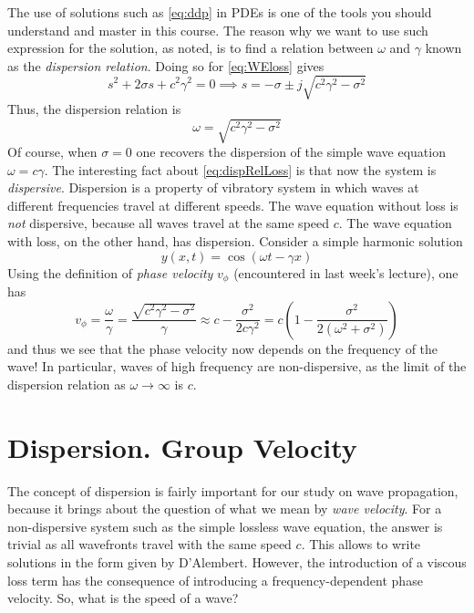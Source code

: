\documentclass[11pt,twoside,a4paper,english]{book}
\begin{document}
\medskip \medskip 
\noindent
The use of solutions such as \eqref{eq:ddp} in PDEs is one of the tools you should understand and master in this course. The reason why we want to use such expression for the solution, as noted, is to find a relation between $\omega$ and $\gamma$ known as the \emph{dispersion relation}. Doing so for \eqref{eq:WEloss} gives
\begin{equation}
s^2 + 2 \sigma s + c^2 \gamma^2 = 0 \implies s = - \sigma \pm j \sqrt{c^2\gamma^2 - \sigma^2}
\end{equation}
Thus, the dispersion relation is
\begin{equation}\label{eq:dispRelLoss}
\omega = \sqrt{c^2\gamma^2 - \sigma^2}
\end{equation}
Of course, when $\sigma=0$ one recovers the dispersion of the simple wave equation $\omega = c\gamma$. The interesting fact about \eqref{eq:dispRelLoss} is that now the system is \emph{dispersive}. Dispersion is a property of vibratory system in which waves at different frequencies travel at different speeds. The wave equation without loss is \emph{not} dispersive, because all waves travel at the same speed $c$. The wave equation with loss, on the other hand, has dispersion. Consider a simple harmonic solution
\begin{equation}
y(x,t) = \cos(\omega t - \gamma x) 
\end{equation}
Using the definition of \emph{phase velocity}  $v_\phi$ (encountered in last week's lecture), one has
\begin{equation}
v_\phi = \frac{\omega}{\gamma} = \frac{\sqrt{c^2 \gamma^2 - \sigma^2}}{\gamma} \approx c - \frac{\sigma^2}{2c\gamma^2} = c \left(1 - \frac{\sigma^2}{2(\omega^2+\sigma^2)} \right)
\end{equation}
and thus we see that the phase velocity now depends on the frequency of the wave! In particular, waves of high frequency are non-dispersive, as the limit of the dispersion relation as $\omega \rightarrow \infty$ is $c$.


\section{Dispersion. Group Velocity}

The concept of dispersion is fairly important for our study on wave propagation, because it brings about the question of what we mean by \emph{wave velocity}. For a non-dispersive system such as the simple lossless wave equation, the answer is trivial as all wavefronts travel with the same speed $c$. This allows to write solutions in the form given by D'Alembert. However, the introduction of a viscous loss term has the consequence of introducing a frequency-dependent phase velocity. So, what is the speed of a wave? 
\end{document}
